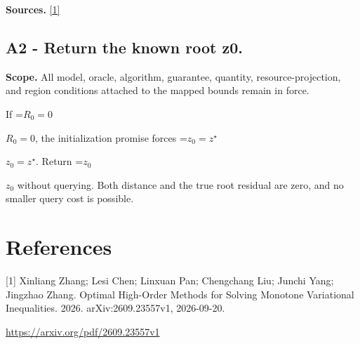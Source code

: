 \documentclass[10pt,a4paper]{article}
\newcommand{\AtlasMath}[1]{\par\begingroup\centering\setbox0=\hbox{$\displaystyle #1$}\ifdim\wd0>1.4\linewidth\typeout{ATLAS WIDE FORMULA: \the\wd0}\fi\ifdim\wd0>\linewidth\resizebox{\linewidth}{!}{\box0}\else\box0\fi\par\endgroup}
\newcommand{\AtlasInlineMath}[1]{\begingroup\setbox0=\hbox{$#1$}\ifdim\wd0>.4\linewidth\endgroup\AtlasMath{#1}\else\endgroup$#1$\fi}
\begin{document}
\textbf{Sources.} \href{https://arxiv.org/pdf/2609.23557v1}{[1]}

\subsection{A2 - Return the known root z0.}
\textbf{Scope.} All model, oracle, algorithm, guarantee, quantity, resource-projection, and region conditions attached to the mapped bounds remain in force.

If \AtlasInlineMath{R_0=0}, the initialization promise forces \AtlasInlineMath{z_0=z^\star}. Return \AtlasInlineMath{z_0} without querying. Both distance and the true root residual are zero, and no smaller query cost is possible.

\section{References}
[1] Xinliang Zhang; Lesi Chen; Linxuan Pan; Chengchang Liu; Junchi Yang; Jingzhao Zhang. Optimal High-Order Methods for Solving Monotone Variational Inequalities. 2026. arXiv:2609.23557v1, 2026-09-20.

\url{https://arxiv.org/pdf/2609.23557v1}
\end{document}
